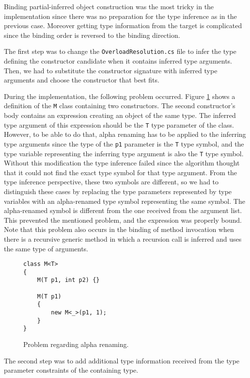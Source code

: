 Binding partial-inferred object construction was the most tricky in the implementation since there was no preparation for the type inference as in the previous case. 
Moreover getting type information from the target is complicated since the binding order is reversed to the binding direction.
\par
The first step was to change the \texttt{OverloadResolution.cs} file to infer the type defining the constructor candidate when it contains inferred type arguments. 
Then, we had to substitute the constructor signature with inferred type arguments and choose the constructor that best fits.
\par
During the implementation, the following problem occurred. 
Figure \ref{img70:alpha} shows a definition of the \texttt{M} class containing two constructors. 
The second constructor’s body contains an expression creating an object of the same type.
The inferred type argument of this expression should be the \texttt{T} type parameter of the class. 
However, to be able to do that, alpha renaming has to be applied to the inferring type arguments since the type of the \texttt{p1} parameter is the \texttt{T} type symbol, and the type variable representing the inferring type argument is also the \texttt{T} type symbol.
Without this modification the type inference failed since the algorithm thought that it could not find the exact type symbol for that type argument. 
From the type inference perspective, these two symbols are different, so we had to distinguish these cases by replacing the type parameters represented by type variables with an alpha-renamed type symbol representing the same symbol. 
The alpha-renamed symbol is different from the one received from the argument list. 
This prevented the mentioned problem, and the expression was properly bound. 
Note that this problem also occurs in the binding of method invocation when there is a recursive generic method in which a recursion call is inferred and uses the same type of arguments.
\begin{figure}[h]
\begin{lstlisting}[style=csharp, showstringspaces=false]
class M<T> 
{
    M(T p1, int p2) {}
    
    M(T p1) 
    {
        new M<_>(p1, 1);
    }
}
\end{lstlisting}
\caption{Problem regarding alpha renaming.}
\label{img70:alpha}
\end{figure}
\par
The second step was to add additional type information received from the type parameter constraints of the containing type.
